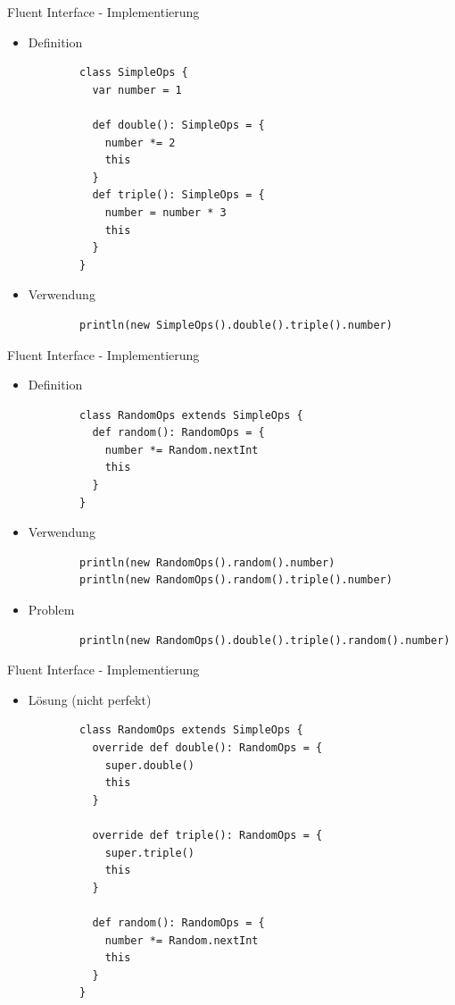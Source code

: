 \documentclass{beamer}
\begin{document}

\begin{frame}[fragile]{Fluent Interface - Implementierung}
\begin{itemize}
	\item Definition
		\begin{lstlisting}
		class SimpleOps {
		  var number = 1
  
		  def double(): SimpleOps = {
		    number *= 2
		    this
		  }
		  def triple(): SimpleOps = {
		    number = number * 3
		    this
		  }
		}
		\end{lstlisting}
	\item Verwendung
		\begin{lstlisting}
		println(new SimpleOps().double().triple().number)
		\end{lstlisting}
\end{itemize}
\end{frame}


\begin{frame}[fragile]{Fluent Interface - Implementierung}
\begin{itemize}
	\item Definition
		\begin{lstlisting}
		class RandomOps extends SimpleOps {
		  def random(): RandomOps = {
		    number *= Random.nextInt
		    this
		  }
		}
		\end{lstlisting}
	\item Verwendung
		\begin{lstlisting}
		println(new RandomOps().random().number)
		println(new RandomOps().random().triple().number)
		\end{lstlisting}
	\pause
	\item Problem
		\begin{lstlisting}
		println(new RandomOps().double().triple().random().number)
		\end{lstlisting}
\end{itemize}
\end{frame}


\begin{frame}[fragile]{Fluent Interface - Implementierung}
\begin{itemize}
	\item Lösung (nicht perfekt)
		\begin{lstlisting}
		class RandomOps extends SimpleOps {
		  override def double(): RandomOps = {
		    super.double()
		    this
		  }

		  override def triple(): RandomOps = {
		    super.triple()
		    this
		  }

		  def random(): RandomOps = {
		    number *= Random.nextInt
		    this
		  }
		}
		\end{lstlisting}
\end{itemize}
\end{frame}
\end{document}

